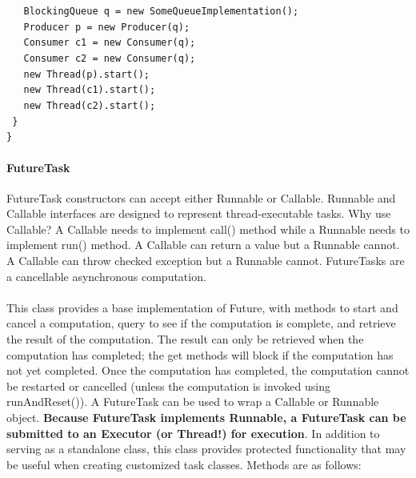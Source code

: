 \documentclass{article}
\begin{document}
    \lstinline|   BlockingQueue q = new SomeQueueImplementation();|\\
    \lstinline|   Producer p = new Producer(q);|\\
    \lstinline|   Consumer c1 = new Consumer(q);|\\
    \lstinline|   Consumer c2 = new Consumer(q);|\\
    \lstinline|   new Thread(p).start();|\\
    \lstinline|   new Thread(c1).start();|\\
    \lstinline|   new Thread(c2).start();|\\
    \lstinline| }|\\
    \lstinline|}|

\paragraph{FutureTask} FutureTask constructors can accept either Runnable or Callable. Runnable and Callable interfaces are designed to represent thread-executable tasks. Why use Callable? A Callable needs to implement call() method while a Runnable needs to implement run() method. A Callable can return a value but a Runnable cannot. A Callable can throw checked exception but a Runnable cannot. FutureTasks are a cancellable asynchronous computation.\\\\
This class provides a base implementation of Future, with methods to start and cancel a computation, query to see if the computation is complete, and retrieve the result of the computation. The result can only be retrieved when the computation has completed; the get methods will block if the computation has not yet completed. Once the computation has completed, the computation cannot be restarted or cancelled (unless the computation is invoked using runAndReset()). A FutureTask can be used to wrap a Callable or Runnable object. \textbf{Because FutureTask implements Runnable, a FutureTask can be submitted to an Executor (or Thread!) for execution}. In addition to serving as a standalone class, this class provides protected functionality that may be useful when creating customized task classes. Methods are as follows:
\end{document}
